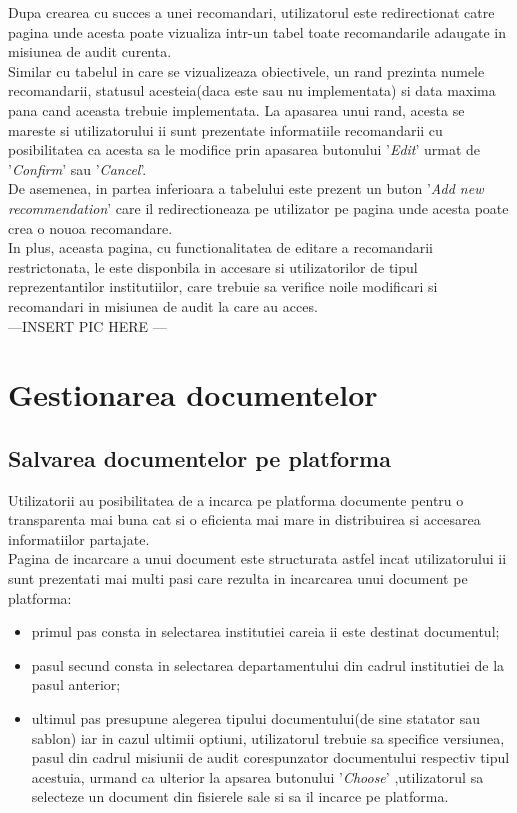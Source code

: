 Dupa crearea cu succes a unei recomandari, utilizatorul este redirectionat catre pagina unde acesta poate vizualiza intr-un tabel toate recomandarile adaugate in misiunea de audit curenta.\\
Similar cu tabelul in care se vizualizeaza obiectivele, un rand prezinta numele recomandarii, statusul acesteia(daca este sau nu implementata) si data maxima pana cand aceasta trebuie implementata. La apasarea unui rand, acesta se mareste si utilizatorului ii sunt prezentate informatiile recomandarii cu posibilitatea ca acesta sa le modifice prin apasarea butonului '\textit{Edit}' urmat de '\textit{Confirm}' sau '\textit{Cancel}'.\\
De asemenea, in partea inferioara a tabelului este prezent un buton '\textit{Add new recommendation}' care il redirectioneaza pe utilizator pe pagina unde acesta poate crea o nouoa recomandare.\\
In plus, aceasta pagina, cu functionalitatea de editare a recomandarii restrictonata, le este disponbila in accesare si utilizatorilor de tipul reprezentantilor institutiilor, care trebuie sa verifice noile modificari si recomandari in misiunea de audit la care au acces.\\

---INSERT PIC HERE --- 	

\section{Gestionarea documentelor}

\subsection*{Salvarea documentelor pe platforma}

Utilizatorii au posibilitatea de a incarca pe platforma documente pentru o transparenta mai buna cat si o eficienta mai mare in distribuirea si accesarea informatiilor partajate.\\
Pagina de incarcare a unui document este structurata astfel incat utilizatorului ii sunt prezentati mai multi pasi care rezulta in incarcarea unui document pe platforma:
	
	\begin{itemize}
		\item  primul pas consta in selectarea institutiei careia ii este destinat documentul;
		
		\item pasul secund consta in selectarea departamentului din cadrul institutiei de la pasul anterior;
		
		\item ultimul pas presupune alegerea tipului documentului(de sine statator sau sablon) iar in cazul ultimii optiuni, utilizatorul trebuie sa specifice versiunea, pasul din cadrul misiunii de audit corespunzator documentului respectiv tipul acestuia, urmand ca ulterior la apsarea butonului '\textit{Choose}' ,utilizatorul sa selecteze un document din fisierele sale si sa il incarce pe platforma.
		
		
	\end{itemize}

